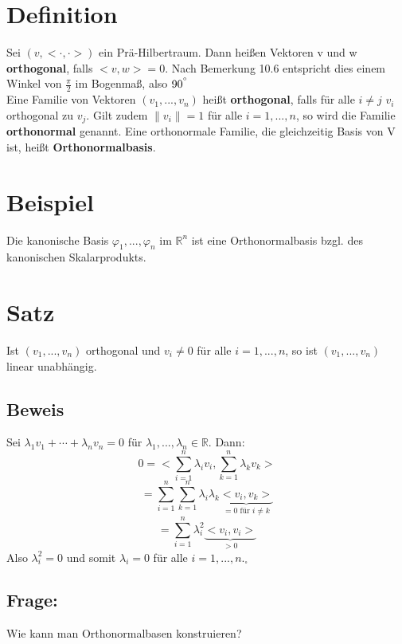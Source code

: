 \documentclass{scrbook}
\begin{document}
\section{Definition}
Sei $(v,<\cdot,\cdot>)$ ein Prä-Hilbertraum. Dann heißen Vektoren v und w \textbf{orthogonal}, falls $<v,w> = 0$. Nach Bemerkung 10.6 entspricht dies einem Winkel von $\frac{\pi}{2}$ im Bogenmaß, also $90^{\degree}$\\
Eine Familie von Vektoren $(v_1,...,v_n)$ heißt \textbf{orthogonal}, falls für alle $i \neq j$ $v_i$ orthogonal zu $v_j$. Gilt zudem $\|v_i\| = 1$ für alle $i=1,...,n$, so wird die Familie \textbf{orthonormal} genannt. Eine orthonormale Familie, die gleichzeitig Basis von V ist, heißt \textbf{Orthonormalbasis}.
\section{Beispiel}
Die kanonische Basis $\varphi_1,...,\varphi_n$ im $\mathbb{R}^n$ ist eine Orthonormalbasis bzgl. des kanonischen Skalarprodukts.
\section{Satz}
Ist $(v_1,...,v_n)$ orthogonal und $v_i \neq 0$ für alle $i=1,...,n$, so ist $(v_1,...,v_n)$ linear unabhängig.
\subsection*{Beweis}
Sei $\lambda_1 v_1 + \cdots + \lambda_n v_n = 0$ für $\lambda_1,...,\lambda_n \in \mathbb{R}$. Dann:
\[0 = <\sum^n_{i=1} \lambda_i v_i , \sum^n_{k=1} \lambda_k v_k>\]
\[=\sum^n_{i=1} \sum^n_{k=1} \lambda_i \lambda_k \underbrace{<v_i,v_k>}_{=0 \text{ für } i\neq k}\] \[= \sum^n_{i=1} \lambda_i^2 \underbrace{<v_i,v_i>}_{>0}\]
Also $\lambda_i^2 = 0$ und somit $\lambda_i = 0$ für alle $i=1,...,n$.$_\square$
\subsection*{Frage:}
Wie kann man Orthonormalbasen konstruieren?
\end{document}
